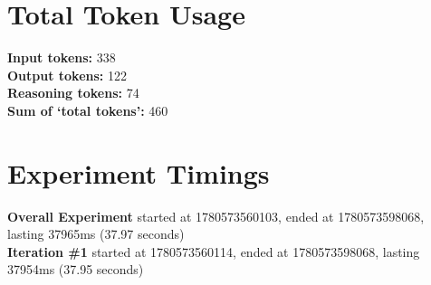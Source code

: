 \documentclass{article}
\begin{document}
\section*{Total Token Usage}
\textbf{Input tokens: }338
\\\textbf{Output tokens: }122
\\\textbf{Reasoning tokens: }74
\\\textbf{Sum of `total tokens': }460
\section*{Experiment Timings}
\textbf{Overall Experiment} started at 1780573560103, ended at 1780573598068, lasting 37965ms (37.97 seconds)
\\\textbf{Iteration \#1} started at 1780573560114, ended at 1780573598068, lasting 37954ms (37.95 seconds)
\end{document}
